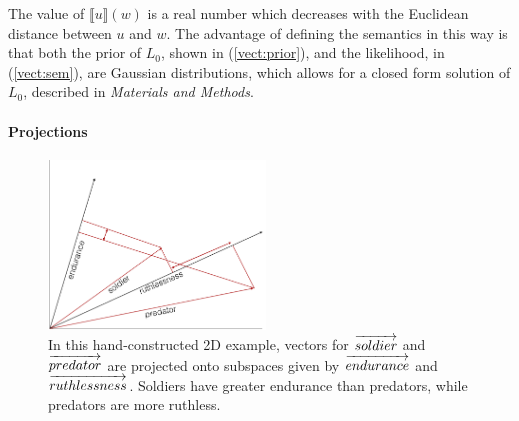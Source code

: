 \documentclass[9pt,twocolumn,twoside,lineno]{pnas-new}
\begin{document}



		The value of $\llbracket u\rrbracket(w)$ is a real number which decreases with the Euclidean distance between $u$ and $w$. 
		The advantage of defining the semantics in this way is that both the prior of $L_0$, shown in (\ref{vect:prior}), and the likelihood, in (\ref{vect:sem}), are Gaussian distributions, which allows for a closed form solution of $L_0$, described in \emph{Materials and Methods}. 

	\paragraph{Projections} 

		\begin{figure}
		\centering
			\includegraphics[height=4.5cm]{images/diagram2.png}
			\caption{In this hand-constructed 2D example, vectors for $\protect\overrightarrow{soldier}$ and $\protect\overrightarrow{predator}$ are projected onto subspaces given by $\protect\overrightarrow{endurance}$ and $\protect\overrightarrow{ruthlessness}$. Soldiers have greater endurance than predators, while predators are more ruthless.}
			\label{fig:1}
		\end{figure}
\end{document}
